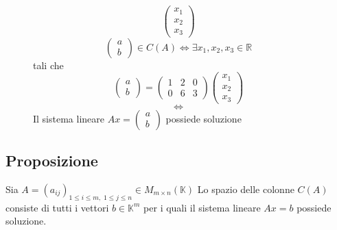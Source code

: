 \documentclass[a4paper]{article}
\theoremstyle{break}
\theoremstyle{break}
\theoremstyle{break}
\theoremstyle{break}
\begin{document}
\begin{figure}[H]
\begin{example}
\[     \begin{pmatrix} 
       x_1\\
       x_2\\
       x_3
     \end{pmatrix} 
    \] 
    \[
      \begin{pmatrix} a\\b \end{pmatrix} \in C(A) \Leftrightarrow \exists x_1,x_2,x_3 \in \mathbb{R}
    \] 
    tali che
    \[
    \begin{pmatrix} a\\b \end{pmatrix} = \begin{pmatrix}
    1 & 2 & 0\\
    0 & 6 & 3
  \end{pmatrix} 
  \begin{pmatrix} 
    x_1\\
    x_2\\
    x_3
  \end{pmatrix} 
    \] 
    \[
      \Leftrightarrow
    \] 
    Il sistema lineare \( Ax = \begin{pmatrix} a\\b \end{pmatrix}  \) possiede soluzione

  \end{example}
\end{figure}

\subsection{Proposizione}
Sia \( A = (a_{ij})_{1 \le i \le m,\; 1 \le j \le n} \in M_{m \times n}(\mathbb{K}) \) 
Lo spazio delle colonne \( C(A) \) consiste di tutti i vettori \( b \in \mathbb{K}^m \)
per i quali il sistema lineare \( Ax = b \) possiede soluzione.
\end{document}
